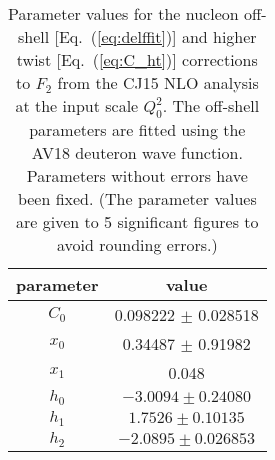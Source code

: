 \documentclass[aps,prd,amsmath,preprint]{revtex4}
\begin{document}
\begin{table}[h]
\begin{center}
\caption{Parameter values for the nucleon off-shell
	[Eq.~(\ref{eq:delffit})] and higher twist
	[Eq.~(\ref{eq:C_ht})] corrections to $F_2$ from
	the CJ15 NLO analysis at the input scale $Q_0^2$.
	The off-shell parameters are fitted using the
	AV18 deuteron wave function.
	Parameters without errors have been fixed.
	(The parameter values are given to 5 significant
	figures to avoid rounding errors.) \\}
{\scriptsize
\begin{tabular}{c|c}\hline
parameter	& value				\\ \hline
$C_0$ 		& 0.098222 $\pm$ 0.028518	\\
$x_0$ 		& 0.34487  $\pm$ 0.91982	\\
$x_1$		& 0.048				\\ \hline
%
$h_0$		& $-3.0094 \pm 0.24080$		\\    
$h_1$ 		& $ 1.7526 \pm 0.10135$         \\       
$h_2$ 		& $-2.0895 \pm 0.026853$        \\ \hline
\end{tabular}
}
\label{tab:other_params}
\end{center}
\end{table}
\end{document}
